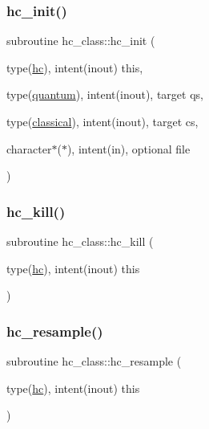 \mbox{\label{namespacehc__class_a6a95655090afaac2c5f7b049c3919597}} 
\subsubsection{\texorpdfstring{hc\+\_\+init()}{hc\_init()}}
{\footnotesize\ttfamily subroutine hc\+\_\+class\+::hc\+\_\+init (\begin{DoxyParamCaption}\item[{type(\hyperlink{structhc__class_1_1hc}{hc}), intent(inout)}]{this,  }\item[{type(\hyperlink{structquantum__class_1_1quantum}{quantum}), intent(inout), target}]{qs,  }\item[{type(\hyperlink{structclassical__class_1_1classical}{classical}), intent(inout), target}]{cs,  }\item[{character$\ast$($\ast$), intent(in), optional}]{file }\end{DoxyParamCaption})\hspace{0.3cm}{\ttfamily [private]}}

\mbox{\label{namespacehc__class_a72759d56fe1bbe360bfe0efaae62b6a6}} 
\subsubsection{\texorpdfstring{hc\+\_\+kill()}{hc\_kill()}}
{\footnotesize\ttfamily subroutine hc\+\_\+class\+::hc\+\_\+kill (\begin{DoxyParamCaption}\item[{type(\hyperlink{structhc__class_1_1hc}{hc}), intent(inout)}]{this }\end{DoxyParamCaption})}

\mbox{\label{namespacehc__class_a1b4a0d9a46c63f538c74670dca5fdc82}} 
\subsubsection{\texorpdfstring{hc\+\_\+resample()}{hc\_resample()}}
{\footnotesize\ttfamily subroutine hc\+\_\+class\+::hc\+\_\+resample (\begin{DoxyParamCaption}\item[{type(\hyperlink{structhc__class_1_1hc}{hc}), intent(inout)}]{this }\end{DoxyParamCaption})\hspace{0.3cm}{\ttfamily [private]}}

